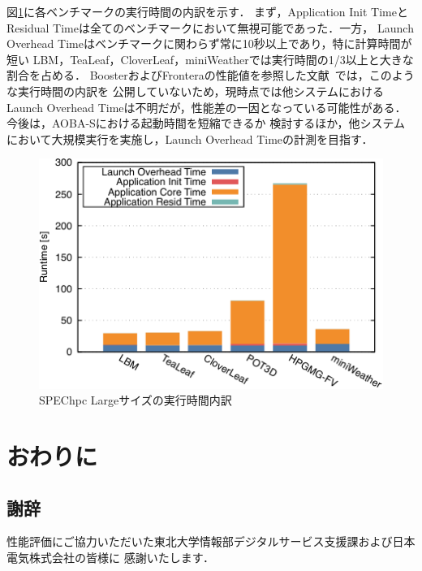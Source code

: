 ﻿\documentclass[submit,techrep,noauthor]{ipsj}
\begin{document}
図\ref{fig:spechpc-profile2}に各ベンチマークの実行時間の内訳を示す．
まず，Application Init TimeとResidual Timeは全てのベンチマークにおいて無視可能であった．一方，
Launch Overhead Timeはベンチマークに関わらず常に10秒以上であり，特に計算時間が短い
LBM，TeaLeaf，CloverLeaf，miniWeatherでは実行時間の1/3以上と大きな割合を占める．
BoosterおよびFronteraの性能値を参照した文献~\cite{Brunst2022}では，このような実行時間の内訳を
公開していないため，現時点では他システムにおけるLaunch Overhead
Timeは不明だが，性能差の一因となっている可能性がある．今後は，AOBA-Sにおける起動時間を短縮できるか
検討するほか，他システムにおいて大規模実行を実施し，Launch Overhead Timeの計測を目指す．

\begin{figure}[tb]
  \centering
  \includegraphics{figs/spechpc_profile2.pdf}
  \caption{SPEChpc Largeサイズの実行時間内訳}\label{fig:spechpc-profile2}
\end{figure}

\section{おわりに}

\subsection*{謝辞}

性能評価にご協力いただいた東北大学情報部デジタルサービス支援課および日本電気株式会社の皆様に
感謝いたします．



\end{document}

